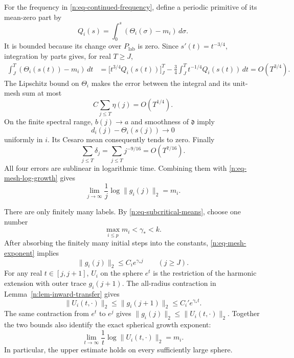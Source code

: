 For the frequency in \eqref{n:eq-continued-frequency}, define a periodic
primitive of its mean-zero part by
\[
 Q_i(s)=\int_0^s(\Theta_i(\sigma)-m_i)\,d\sigma.
\]
It is bounded because its change over \(P_{\mathrm{lab}}\) is zero.
Since \(s'(t)=t^{-3/4}\), integration by parts gives, for real \(T\geq J\),
\begin{align}
 \int_J^T(\Theta_i(s(t))-m_i)\,dt
 &=\bigl[t^{3/4}Q_i(s(t))\bigr]_J^T
       -\frac34\int_J^T t^{-1/4}Q_i(s(t))\,dt
 =O(T^{3/4}).
 \label{n:eq-phase-average}
\end{align}
The Lipschitz bound on \(\Theta_i\) makes the error between the integral
and its unit-mesh sum at most
\[
 C\sum_{j\leq T}\eta(j)=O(T^{1/4}).
\]
On the finite spectral range, \(b(j)\to a\) and smoothness of
\(\mathfrak d\) imply
\[
 d_i(j)-\Theta_i(s(j))\longrightarrow0
\]
uniformly in \(i\).  Its Cesaro mean consequently tends to zero.
Finally
\[
 \sum_{j\leq T}\delta_j
 =\sum_{j\leq T}j^{-9/16}=O(T^{7/16}).
\]
All four errors are sublinear in logarithmic time.  Combining them with
\eqref{n:eq-mesh-log-growth} gives
\begin{equation}
 \lim_{j\to\infty}\frac1j\log\|g_i(j)\|_2=m_i.
 \label{n:eq-mesh-exponent}
\end{equation}

There are only finitely many labels.  By \eqref{n:eq-subcritical-means},
choose one number
\[
 \max_{i\leq p}m_i<\gamma_*<k.
\]
After absorbing the finitely many initial steps into the constants,
\eqref{n:eq-mesh-exponent} implies
\begin{equation}
 \|g_i(j)\|_2\leq C_i e^{\gamma_* j}
 \qquad(j\geq J).
 \label{n:eq-mesh-bound}
\end{equation}
For any real \(t\in[j,j+1]\), \(U_i\) on the sphere \(e^t\) is the
restriction of the harmonic extension with outer trace \(g_i(j+1)\).
The all-radius contraction in Lemma~\ref{n:lem-inward-transfer} gives
\begin{equation}
 \|U_i(t,\cdot)\|_2
 \leq\|g_i(j+1)\|_2
 \leq C_i' e^{\gamma_* t}.
 \label{n:eq-all-radius-sphere-bound}
\end{equation}
The same contraction from \(e^t\) to \(e^j\) gives
\(\|g_i(j)\|_2\leq\|U_i(t,\cdot)\|_2\). Together the two bounds also
identify the exact spherical growth exponent:
\[
 \lim_{t\to\infty}\frac1t\log\|U_i(t,\cdot)\|_2=m_i.
\]
In particular, the upper estimate holds on every sufficiently large sphere.

